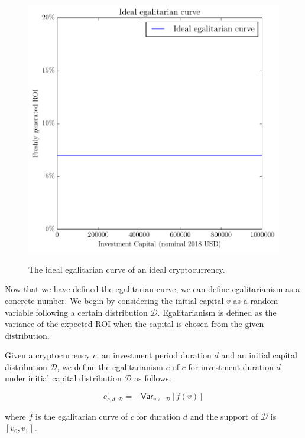 \begin{figure}[H]
    \caption{The ideal egalitarian curve of an ideal cryptocurrency.}
    \centering
    \includegraphics[width=0.75 \columnwidth,keepaspectratio]{figures/ideal.pdf}
    \label{fig:ideal}
\end{figure}

Now that we have defined the egalitarian curve, we can define egalitarianism
as a concrete number. We begin by considering the initial capital $v$ as a
random variable following a certain distribution $\mathcal{D}$. Egalitarianism
is defined as the variance of the expected ROI when the capital is chosen from
the given distribution.

\begin{definition}[Egalitarianism]
  Given a cryptocurrency $c$, an investment period duration $d$ and an initial
  capital distribution $\mathcal{D}$, we define the egalitarianism $e$ of $c$
  for investment duration $d$ under initial capital distribution $\mathcal{D}$
  as follows:

  \[
    e_{c,d,\mathcal{D}} = -\textsf{Var}_{v \gets \mathcal{D}}[f(v)]
  \]

  where $f$ is the egalitarian curve of $c$ for duration $d$ and the support of
  $\mathcal{D}$ is $[v_0, v_1]$.
\end{definition}
